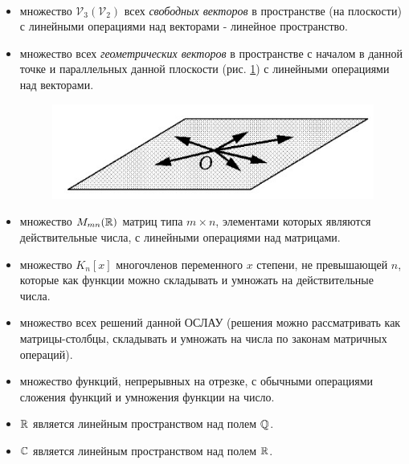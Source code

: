 \begin{example}~
    \begin{itemize}[nosep]
        \item множество $\mathcal{V}_3 (\mathcal{V}_2)$ всех \textit{свободных векторов} в пространстве (на плоскости) с линейными операциями над векторами - линейное пространство.
        
        \item множество всех \textit{геометрических векторов} в пространстве с началом в данной точке и параллельных данной плоскости (рис. \ref{fig:picture_02_1}) с линейными операциями над векторами.
        \begin{figure}[H]
            \centering
            \includegraphics[scale=0.5]{images/module1/question02/1.jpg}
            \label{fig:picture_02_1}
            \caption{}
        \end{figure}

        \item множество $M_{mn}(\mathbb{R})$ матриц типа $m \times n$, элементами которых являются действительные числа, с линейными операциями над матрицами.

        \item множество $K_n[x]$ многочленов переменного $x$ степени, не превышающей $n$, которые как функции можно складывать и умножать на действительные числа.

        \item множество всех решений данной ОСЛАУ (решения можно рассматривать как матрицы-столбцы, складывать и умножать на числа по законам матричных операций).

        \item множество функций, непрерывных на отрезке, с обычными операциями сложения функций и умножения функции на число.

        \item $\mathbb{R}$ является линейным пространством над полем $\mathbb{Q}$.
        
        \item $\mathbb{C}$ является линейным пространством над полем $\mathbb{R}$.
    \end{itemize}
\end{example}
